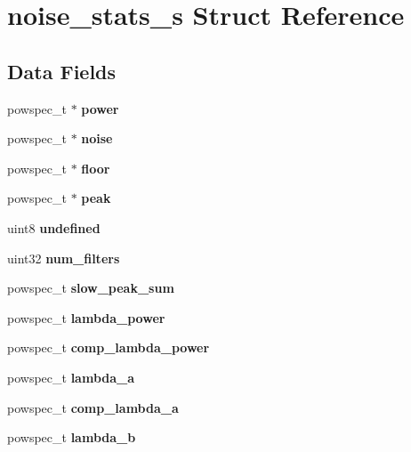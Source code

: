 \section{noise\+\_\+stats\+\_\+s Struct Reference}
\label{structnoise__stats__s}
\subsection*{Data Fields}
\begin{DoxyCompactItemize}
\item 
\mbox{\label{structnoise__stats__s_a3352c66489d54b578e5f43cc646951dc}} 
powspec\+\_\+t $\ast$ {\bfseries power}
\item 
\mbox{\label{structnoise__stats__s_ab21b71b8202302859b120b08b42bb4bb}} 
powspec\+\_\+t $\ast$ {\bfseries noise}
\item 
\mbox{\label{structnoise__stats__s_aea4aaa0528b85a2989743afee3f21964}} 
powspec\+\_\+t $\ast$ {\bfseries floor}
\item 
\mbox{\label{structnoise__stats__s_a36e6b3a83014d30755b763fa8575a35d}} 
powspec\+\_\+t $\ast$ {\bfseries peak}
\item 
\mbox{\label{structnoise__stats__s_a84138e0f5dd6bc3c8049cce8ea815678}} 
uint8 {\bfseries undefined}
\item 
\mbox{\label{structnoise__stats__s_ad5b17abb96cc825153b41f1506018c3c}} 
uint32 {\bfseries num\+\_\+filters}
\item 
\mbox{\label{structnoise__stats__s_a9038ab6afc8ff2df63952cc16d032f0d}} 
powspec\+\_\+t {\bfseries slow\+\_\+peak\+\_\+sum}
\item 
\mbox{\label{structnoise__stats__s_aae414a12fd0b4b8be3a61468fe15f3de}} 
powspec\+\_\+t {\bfseries lambda\+\_\+power}
\item 
\mbox{\label{structnoise__stats__s_a7d2228c947b372142346861adbf16acb}} 
powspec\+\_\+t {\bfseries comp\+\_\+lambda\+\_\+power}
\item 
\mbox{\label{structnoise__stats__s_a804b3c775a7d80c95a2a53e9eb0d6b3a}} 
powspec\+\_\+t {\bfseries lambda\+\_\+a}
\item 
\mbox{\label{structnoise__stats__s_a047be8fb044da7e3a3f45b78e9d5de23}} 
powspec\+\_\+t {\bfseries comp\+\_\+lambda\+\_\+a}
\item 
\mbox{\label{structnoise__stats__s_a56527a4cfd15aac96133ed20989c89c7}} 
powspec\+\_\+t {\bfseries lambda\+\_\+b}
\item 
\mbox{\label{structnoise__stats__s_ac3317afbf629cadc04b41c5657f0140d}} 

\end{DoxyCompactItemize}
